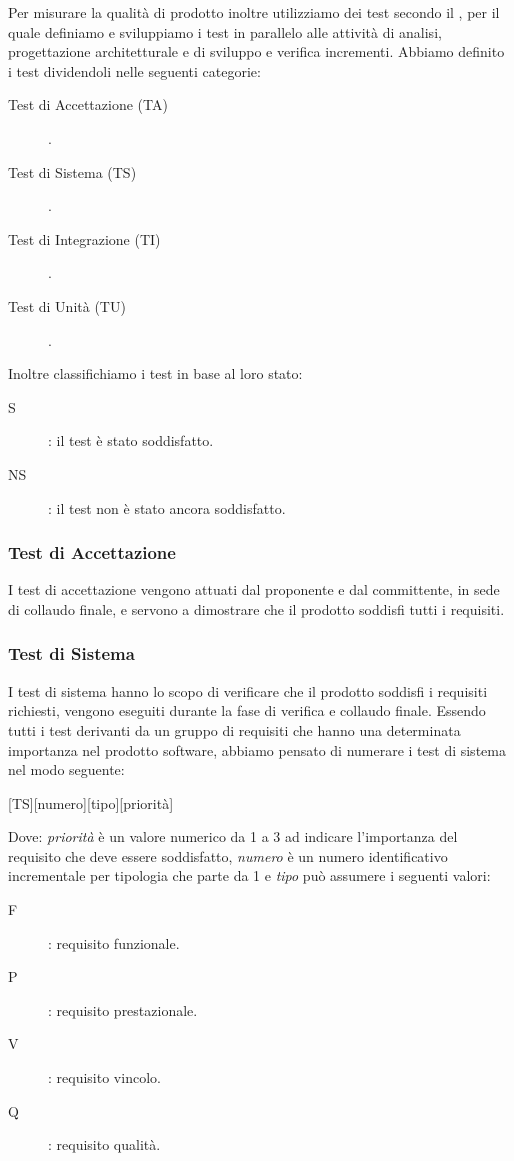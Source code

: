 \documentclass[../piano-di-qualifica.tex]{subfiles}
\begin{document}
Per misurare la qualità di prodotto inoltre utilizziamo dei test secondo il , per il quale definiamo e sviluppiamo i test in parallelo alle attività di analisi, progettazione architetturale e di sviluppo e verifica incrementi.
Abbiamo definito i test dividendoli nelle seguenti categorie:
\begin{description}
  \item [Test di Accettazione (TA)].
  \item [Test di Sistema (TS)].
  \item [Test di Integrazione (TI)].
  \item [Test di Unità (TU)].
\end{description}

Inoltre classifichiamo i test in base al loro stato:
\begin{description}
  \item [S]: il test è stato soddisfatto.
  \item [NS]: il test non è stato ancora soddisfatto.
\end{description}

\subsubsection{Test di Accettazione}%
\label{subs:test_di_accettazione}

I test di accettazione vengono attuati dal proponente e dal committente, in sede di collaudo finale, e servono a dimostrare che il prodotto soddisfi tutti i requisiti.

\subsubsection{Test di Sistema}%
\label{subs:test_di_sistema}

I test di sistema hanno lo scopo di verificare che il prodotto soddisfi i requisiti richiesti, vengono eseguiti durante la fase di verifica e collaudo finale.
Essendo tutti i test derivanti da un gruppo di requisiti che hanno una determinata importanza nel prodotto software, abbiamo pensato di numerare i test di sistema nel modo seguente:
\begin{center}
  [TS][numero][tipo][priorità]
\end{center}

Dove: \textit{priorità} è un valore numerico da 1 a 3 ad indicare l'importanza del requisito che deve essere soddisfatto, \textit{numero} è un numero identificativo incrementale per tipologia che parte da 1 e \textit{tipo} può assumere i seguenti valori:
\begin{description}
  \item [F]: requisito funzionale.
  \item [P]: requisito prestazionale.
  \item [V]: requisito vincolo.
  \item [Q]: requisito qualità.
\end{description}
\end{document}
